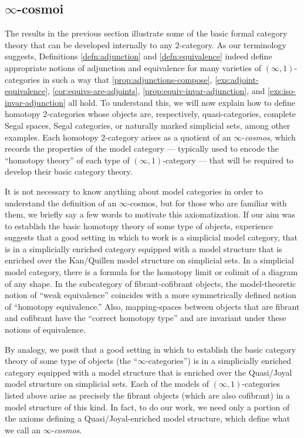 \documentclass[12pt,reqno]{amsart}
\theoremstyle{plain}
\theoremstyle{definition}
\theoremstyle{remark}
\numberwithin{equation}{subsection}
\begin{document}
\subsection{\texorpdfstring{$\infty$}{infinity}-cosmoi}

The results in the previous section illustrate some of the basic formal category theory that can be developed internally to any 2-category. As our terminology suggests, Definitions \ref{defn:adjunction} and \ref{defn:equivalence} indeed define appropriate notions of adjunction and equivalence for many varieties of $(\infty,1)$-categories in such a way that \ref{prop:adjunctions-compose}, \ref{exs:adjoint-equivalence}, \ref{cor:equivs-are-adjoints}, \ref{prop:equiv-invar-adjunction}, and \ref{exs:iso-invar-adjunction} all hold. To understand this, we will now explain how to define homotopy 2-categories whose objects are, respectively, quasi-categories, complete Segal spaces, Segal categories, or naturally marked simplicial sets, among other examples. Each homotopy 2-category arises as a quotient of an $\infty$-\emph{cosmos}, which records the properties of the model category ---  typically used to encode the ``homotopy theory'' of each type of $(\infty,1)$-category --- that will be required to develop their basic category theory.

It is not necessary to know anything about model categories in order to understand the definition of an $\infty$-cosmos, but for those who are familiar with them, we briefly say a few words to motivate this axiomatization. If our aim was to establish the basic homotopy theory of some type of objects, experience suggests that a good setting in which to work is a  simplicial model category, that is in a simplicially enriched category equipped with a model structure that is enriched over the Kan/Quillen model structure on simplicial sets. In a simplicial model category, there is a formula for the homotopy limit or colimit of a diagram of any shape.  In the subcategory of fibrant-cofibrant objects, the model-theoretic notion of ``weak equivalence'' coincides with a more symmetrically defined notion of ``homotopy equivalence.'' Also, mapping-spaces between objects that are fibrant and cofibrant  have the ``correct homotopy type'' and are invariant under these notions of equivalence.

By analogy, we posit that a good setting in which to establish the basic category theory of  some type of objects (the ``$\infty$-categories'') is in a simplicially enriched category equipped with a model structure that is enriched over the Quasi/Joyal model structure on simplicial sets. Each of the models of $(\infty,1)$-categories listed above arise as precisely the fibrant objects (which are also cofibrant) in a model structure of this kind. In fact, to do our work, we need only a portion of the axioms defining a Quasi/Joyal-enriched model structure, which define what we call an $\infty$-\emph{cosmos}.
\end{document}
